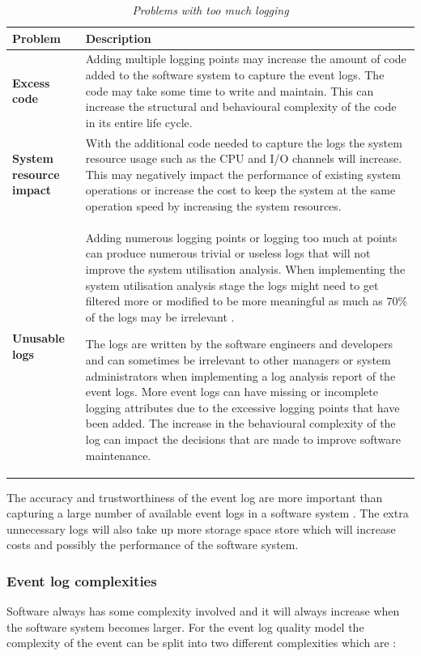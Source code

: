 \begin{table}[!htb]
	\centering
	\caption[Problems with too much logging]
	{\textit{Problems with too much logging \cite{Zhu2015}}}
	\label{tbl:ch1_loggingTooMuch}
	\begin{tabularx}{\textwidth}{|l|X|}
		\hline \textbf{Problem}  & \textbf{Description} \\
		\hline \textbf{Excess code} & Adding multiple logging points may increase the amount of code added to the software system to capture the event logs. The code may take some time to write and maintain. This can increase the structural and behavioural complexity of the code in its entire life cycle. \\
		\hline \textbf{System resource impact} & With the additional code needed to capture the logs the system resource usage such as the CPU and I/O channels will increase. This may negatively impact the performance of existing system operations or increase the cost to keep the system at the same operation speed by increasing the system resources.\\
		\hline \textbf{Unusable logs} & Adding numerous logging points or logging too much at points can produce numerous trivial or useless logs that will not improve the system utilisation analysis. When implementing the system utilisation analysis stage the logs might need to get filtered more or modified to be more meaningful as much as $70\%$ of the logs may be irrelevant \cite{Fedaghi2010}. \par The logs are written by the software engineers and developers and can sometimes be irrelevant to other managers or system administrators when implementing a log analysis report of the event logs. More event logs can have missing or incomplete logging attributes due to the excessive logging points that have been added. The increase in the behavioural complexity of the log can impact the decisions that are made to improve software maintenance. \\
		\hline
	\end{tabularx}
\end{table}

The accuracy and trustworthiness of the event log are more important than capturing a large number of available event logs in a software system \cite{Zhu2015, Jans2012}. The extra unnecessary logs will also take up more storage space store which will increase costs and possibly the performance of the software system. 

\subsubsection{Event log complexities}
Software always has some complexity involved and it will always increase when the software system becomes larger. For the event log quality model the complexity of the event can be split into two different complexities which are \cite{Kherbouche2017}:


